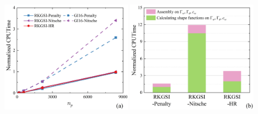 \newpage
\begin{figure}[H]
    \centering
    \begin{subcaptiongroup}
    \includegraphics[width=0.49\textwidth]{figure/PHR/A/Qcputime.png}
    \label{aQcputime}
    \includegraphics[width=0.49\textwidth]{figure/PHR/A/Qefficiency.png}
    \label{aQefficiency}
    \end{subcaptiongroup}
    \caption{}
\label{AQcputime}
\end{figure}
